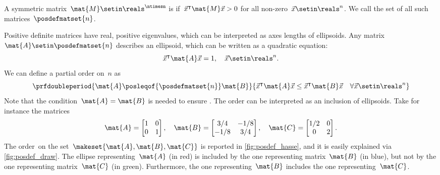 \begin{definition}
    \label{def:positive-definite-matrices}
    A symmetric matrix~$\mat{M}\setin \reals^{\ntimesn}$ is  if~$\vec{x}^\intercal \mat{M}\vec{x}> 0$ for all non-zero~$\vec{x}\setin \reals^n$.
    We call the set of all such matrices~$\posdefmatset{n}$.
\end{definition}
Positive definite matrices have real, positive eigenvalues, which can be interpreted as axes lengths of ellipsoids.
Any matrix~$\mat{A}\setin \posdefmatset{n}$ describes an ellipsoid, which can be written as a quadratic equation:
\begin{equation}
    \label{eq:posdef-ellipsoid}
    \vec{x}^\intercal \mat{A}\vec{x}=1,\quad \vec{x}\setin \reals^n.
\end{equation}
We can define a partial order on~$n$ as
\begin{equation}
    \label{eq:posdef-order}
    \prfdoubleperiod{
        \mat{A}\posleqof{\posdefmatset{n}} \mat{B}
    }{
        \vec{x}^\intercal \mat{A}\vec{x}\leq \vec{x}^\intercal \mat{B}\vec{x} \quad \forall \vec{x}\setin \reals^n
    }
\end{equation}
Note that the condition~$\mat{A}=\mat{B}$ is needed to ensure .
The order can be interpreted as an inclusion of ellipsoids.
Take for instance the matrices
\begin{equation}
    \label{eq:posdef-matrices}
    \mat{A}=
    \begin{bmatrix}
        1 & 0 \\ 0& 1
    \end{bmatrix}, \quad \mat{B}=
    \begin{bmatrix}
        3/4 & -1/8 \\ -1/8& 3/4
    \end{bmatrix},\quad \mat{C}=
    \begin{bmatrix}
        1/2 & 0 \\0& 2
    \end{bmatrix}.
\end{equation}
The order~\posA on the set~$\makeset{\mat{A},\mat{B},\mat{C}}$ is reported in \cref{fig:posdef_hasse}, and it is easily explained via \cref{fig:posdef_draw}.
The ellipse representing~$\mat{A}$ (in red) is included by the one representing matrix~$\mat{B}$ (in blue), but not by the one representing matrix~$\mat{C}$ (in green).
Furthermore, the one representing~$\mat{B}$ includes the one representing~$\mat{C}$.

